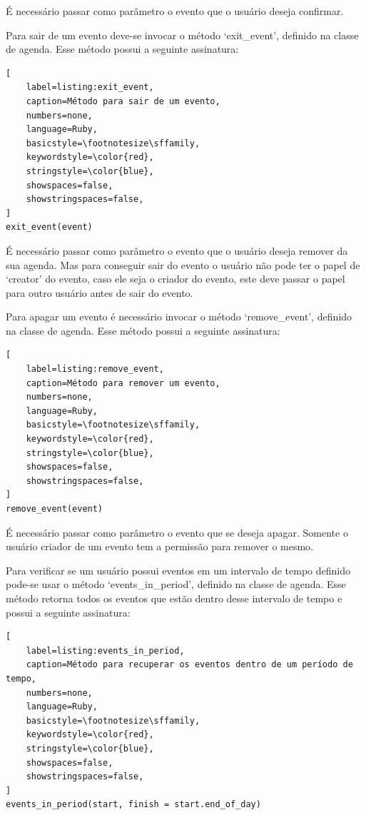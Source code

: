 É necessário passar como parâmetro o evento que o usuário deseja confirmar.

Para sair de um evento deve-se invocar o método `exit\_event', definido na classe de agenda. Esse método possui a seguinte assinatura:

\begin{lstlisting}[
    label=listing:exit_event,
    caption=Método para sair de um evento,
    numbers=none,
    language=Ruby,
    basicstyle=\footnotesize\sffamily,
    keywordstyle=\color{red},
    stringstyle=\color{blue},
    showspaces=false,
    showstringspaces=false,
]
exit_event(event)
\end{lstlisting}

É necessário passar como parâmetro o evento que o usuário deseja remover da sua agenda. Mas para conseguir sair do evento o usuário não pode ter o papel de `creator' do evento, caso ele seja o criador do evento, este deve passar o papel para outro usuário antes de sair do evento.

Para apagar um evento é necessário invocar o método `remove\_event', definido na classe de agenda. Esse método possui a seguinte assinatura:

\begin{lstlisting}[
    label=listing:remove_event,
    caption=Método para remover um evento,
    numbers=none,
    language=Ruby,
    basicstyle=\footnotesize\sffamily,
    keywordstyle=\color{red},
    stringstyle=\color{blue},
    showspaces=false,
    showstringspaces=false,
]
remove_event(event)
\end{lstlisting}

É necessário passar como parâmetro o evento que se deseja apagar. Somente o usuário criador de um evento tem a permissão para remover o mesmo.

Para verificar se um usuário possui eventos em um intervalo de tempo definido pode-se usar o método `events\_in\_period', definido na classe de agenda. Esse método retorna todos os eventos que estão dentro desse intervalo de tempo e possui a seguinte assinatura:

\begin{lstlisting}[
    label=listing:events_in_period,
    caption=Método para recuperar os eventos dentro de um período de tempo,
    numbers=none,
    language=Ruby,
    basicstyle=\footnotesize\sffamily,
    keywordstyle=\color{red},
    stringstyle=\color{blue},
    showspaces=false,
    showstringspaces=false,
]
events_in_period(start, finish = start.end_of_day)
\end{lstlisting}

